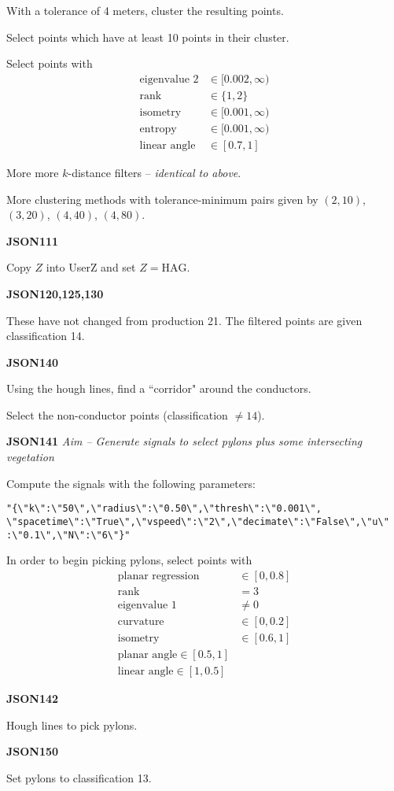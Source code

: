 \documentclass[a4paper,11pt,twoside]{article}
\theoremstyle{definition}
\theoremstyle{remark}
\begin{document}
\begin{list}{}{}
\item With a tolerance of 4 meters, cluster the resulting points.
\item Select points which have at least 10 points in their cluster.
\item Select points with
\begin{align*}
\text{eigenvalue 2}&\in[0.002,\infty)\\
\text{rank}&\in\{1,2\}\\
\text{isometry}&\in [0.001,\infty)\\
\text{entropy}&\in[0.001,\infty)\\
\text{linear angle}&\in [0.7,1]
\end{align*}
\item More more $k$-distance filters -- \emph{identical to above}.
\item More clustering methods with tolerance-minimum pairs given by $(2,10)$, $(3,20)$, $(4,40)$, $(4,80)$.
\item \textbf{JSON111}
\item Copy $Z$ into UserZ and set $Z=\mathrm{HAG}$.
\item \textbf{JSON120,125,130}
\item These have not changed from production 21. The filtered points are given classification 14.
\item \textbf{JSON140}
\item Using the hough lines, find a ``corridor" around the conductors.
\item Select the non-conductor points (classification $\neq 14$).
\item \textbf{JSON141}
\emph{Aim -- Generate signals to select pylons plus some intersecting vegetation}
\item Compute the signals with the following parameters:
\begin{verbatim}
"{\"k\":\"50\",\"radius\":\"0.50\",\"thresh\":\"0.001\",
\"spacetime\":\"True\",\"vspeed\":\"2\",\"decimate\":\"False\",\"u\"
:\"0.1\",\"N\":\"6\"}"
\end{verbatim}
\item In order to begin picking pylons, select points with 
\begin{align*}
\text{planar regression}&\in[0,0.8]\\
\text{rank}&=3\\
\text{eigenvalue 1}&\neq 0\\
\text{curvature}&\in[0,0.2]\\
\text{isometry}&\in [0.6,1]\\
\text{planar angle}\in[0.5,1]\\
\text{linear angle}\in[1,0.5]
\end{align*}
\item\textbf{JSON142}
\item Hough lines to pick pylons. 
\item\textbf{JSON150}
\item Set pylons to classification 13.
\end{list}
\end{document}
